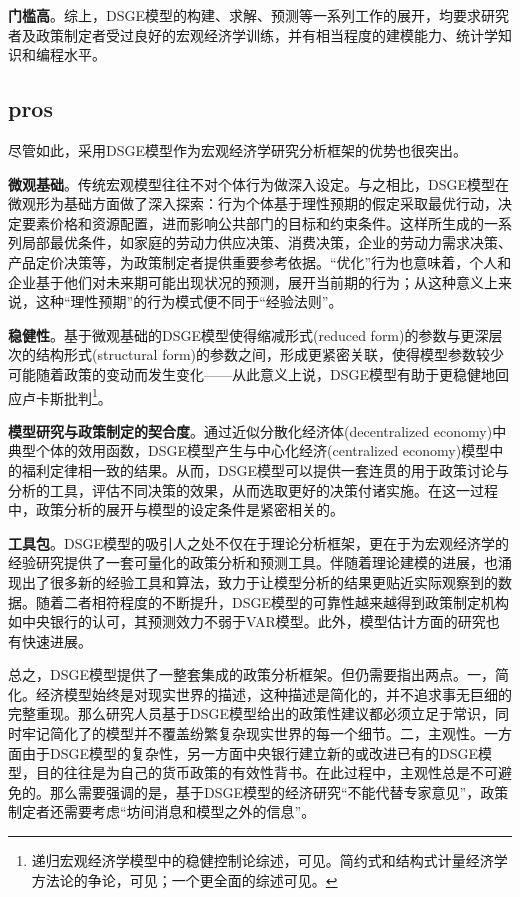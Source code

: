 \textbf{门槛高}。综上，DSGE模型的构建、求解、预测等一系列工作的展开，均要求研究者及政策制定者受过良好的宏观经济学训练，并有相当程度的建模能力、统计学知识和编程水平。

\subsection{pros}
尽管如此，采用DSGE模型作为宏观经济学研究分析框架的优势也很突出。

\textbf{微观基础}。传统宏观模型往往不对个体行为做深入设定。与之相比，DSGE模型在微观形为基础方面做了深入探索：行为个体基于理性预期的假定采取最优行动，决定要素价格和资源配置，进而影响公共部门的目标和约束条件。这样所生成的一系列局部最优条件，如家庭的劳动力供应决策、消费决策，企业的劳动力需求决策、产品定价决策等，为政策制定者提供重要参考依据。``优化''行为也意味着，个人和企业基于他们对未来期可能出现状况的预测，展开当前期的行为；从这种意义上来说，这种``理性预期''的行为模式便不同于``经验法则''。

\textbf{稳健性}。基于微观基础的DSGE模型使得缩减形式(reduced form)的参数与更深层次的结构形式(structural form)的参数之间，形成更紧密关联，使得模型参数较少可能随着政策的变动而发生变化——从此意义上说，DSGE模型有助于更稳健地回应卢卡斯批判\citep{Lucas:1976bm}\footnote{递归宏观经济学模型中的稳健控制论综述，可见\cite{Hansen:2004va}。简约式和结构式计量经济学方法论的争论，可见\cite{Jarrow:2004gy}；一个更全面的综述可见\cite{Angrist:2008vkb}。}。

\textbf{模型研究与政策制定的契合度}。通过近似分散化经济体(decentralized economy)中典型个体的效用函数，DSGE模型产生与中心化经济(centralized economy)模型中的福利定律相一致的结果。从而，DSGE模型可以提供一套连贯的用于政策讨论与分析的工具，评估不同决策的效果，从而选取更好的决策付诸实施。在这一过程中，政策分析的展开与模型的设定条件是紧密相关的。

\textbf{工具包}。DSGE模型的吸引人之处不仅在于理论分析框架，更在于为宏观经济学的经验研究提供了一套可量化的政策分析和预测工具。伴随着理论建模的进展，也涌现出了很多新的经验工具和算法，致力于让模型分析的结果更贴近实际观察到的数据。随着二者相符程度的不断提升，DSGE模型的可靠性越来越得到政策制定机构如中央银行的认可\citep{An:2007cv}，其预测效力不弱于VAR模型\cite{Edge:2010gp}。此外，模型估计方面的研究也有快速进展\citep{Schorfheide:2011tp, FernandezVillaverde:2016wy}。

总之，DSGE模型提供了一整套集成的政策分析框架。但仍需要指出两点。一，简化。经济模型始终是对现实世界的描述，这种描述是简化的，并不追求事无巨细的完整重现。那么研究人员基于DSGE模型给出的政策性建议都必须立足于常识，同时牢记简化了的模型并不覆盖纷繁复杂现实世界的每一个细节。二，主观性。一方面由于DSGE模型的复杂性，另一方面中央银行建立新的或改进已有的DSGE模型，目的往往是为自己的货币政策的有效性背书。在此过程中，主观性总是不可避免的。那么需要强调的是，基于DSGE模型的经济研究``不能代替专家意见''，政策制定者还需要考虑``坊间消息和模型之外的信息''\citep{Bernanke:2007vh}。

